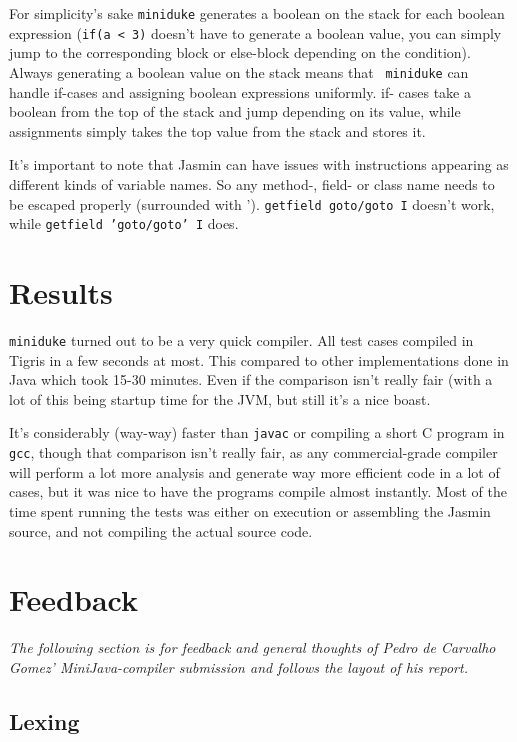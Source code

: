 \documentclass[a4paper,11pt]{article}
\begin{document}
For simplicity's sake {\tt miniduke} generates a boolean on the stack for each
boolean expression ({\tt if(a < 3)} doesn't have to generate a boolean value,
you can simply jump to the corresponding block or else-block depending on the
condition). Always generating a boolean value on the stack means that {\tt
miniduke} can handle if-cases and assigning boolean expressions uniformly. if-
cases take a boolean from the top of the stack and jump depending on its
value, while assignments simply takes the top value from the stack and stores
it.

It's important to note that Jasmin can have issues with instructions appearing
as different kinds of variable names. So any method-, field- or class name
needs to be escaped properly (surrounded with '). {\tt getfield goto/goto I}
doesn't work, while {\tt getfield 'goto/goto' I} does.

\section*{Results}

{\tt miniduke} turned out to be a very quick compiler. All test cases compiled
in Tigris in a few seconds at most. This compared to other implementations done
in Java which took 15-30 minutes. Even if the comparison isn't really fair
(with a lot of this being startup time for the JVM, but still it's a nice
boast.

It's considerably (way-way) faster than {\tt javac} or compiling a short C
program in {\tt gcc}, though that comparison isn't really fair, as any
commercial-grade compiler will perform a lot more analysis and generate way
more efficient code in a lot of cases, but it was nice to have the programs
compile almost instantly. Most of the time spent running the tests was either
on execution or assembling the Jasmin source, and not compiling the actual
source code.

\clearpage

\section*{Feedback}

\emph{The following section is for feedback and general thoughts of Pedro de
Carvalho Gomez' MiniJava-compiler submission and follows the layout of his
report.}

\subsection*{Lexing}
\end{document}
